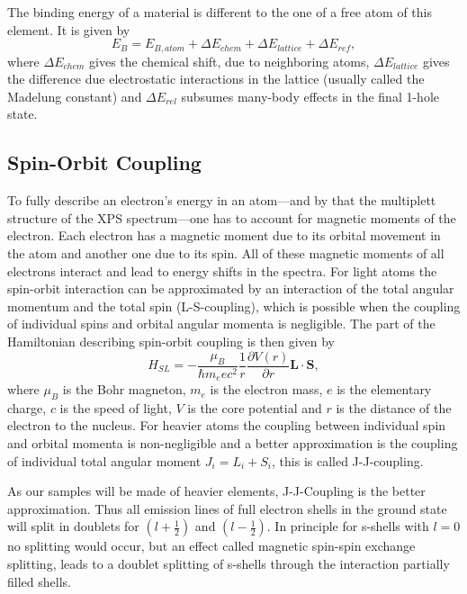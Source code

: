 \documentclass[a4paper,10pt]{scrartcl}
\begin{document}
The binding energy of a material is different to the one of a free atom of this element. It is given by
\begin{equation}
E_{B} = E_{B,atom} + \Delta E_{chem} + \Delta E_{lattice} + \Delta E_{ref}, \label{eq:binding}
\end{equation}
where $\Delta E_{chem}$ gives the chemical shift, due to neighboring atoms, $\Delta E_{lattice}$ gives the difference due electrostatic interactions in the lattice (usually called the Madelung constant) and $\Delta E_{rel}$ subsumes many-body effects in the final 1-hole state.

\subsection{Spin-Orbit Coupling}

To fully describe an electron's energy in an atom---and by that the multiplett structure of the XPS spectrum---one has to account for magnetic moments of the electron. Each electron has a magnetic moment due to its orbital movement in the atom and another one due to its spin. All of these magnetic moments of all electrons interact and lead to energy shifts in the spectra. For light atoms the spin-orbit interaction can be approximated by an interaction of the total angular momentum and the total spin (L-S-coupling), which is possible when the coupling of individual spins and orbital angular momenta is negligible. The part of the Hamiltonian describing spin-orbit coupling is then given by
\begin{equation}
H_{SL} = - \frac{\mu_B}{\hbar m_e e c^2}\frac{1}{r}\frac{\partial V(r)}{\partial r} \boldsymbol{L}\cdot\boldsymbol{S},
\end{equation}
where $\mu_B$ is the Bohr magneton, $m_e$ is the electron mass, $e$ is the elementary charge, $c$ is the speed of light, $V$ is the core potential and $r$ is the distance of the electron to the nucleus.
For heavier atoms the coupling between individual spin and orbital momenta is non-negligible and a better approximation is the coupling of individual total angular moment $J_i=L_i+S_i$, this is called J-J-coupling. 

As our samples will be made of heavier elements, J-J-Coupling is the better approximation. Thus all emission lines of full electron shells in the ground state will split in doublets for $(l+\tfrac{1}{2})$ and $(l-\tfrac{1}{2})$. In principle for s-shells with $l=0$ no splitting would occur, but an effect called magnetic spin-spin exchange splitting, leads to a doublet splitting of s-shells through the interaction partially filled shells.
\end{document}
